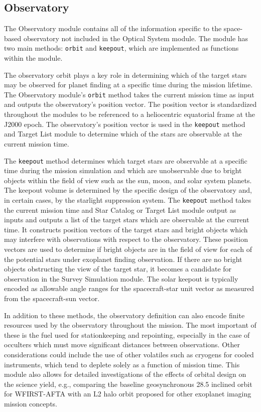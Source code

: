 \documentclass[cleanfoot]{asme2ej}
\begin{document}

\subsection{Observatory}
The Observatory module contains all of the information specific to the space-based observatory not included in the Optical System module. The module has two main methods: \verb+orbit+ and \verb+keepout+, which are implemented as functions within the module. 

The observatory orbit plays a key role in determining which of the target stars may be observed for planet finding at a specific time during the mission lifetime. The Observatory module's \verb+orbit+ method takes the current mission time as input and outputs the observatory's position vector. The position vector is standardized throughout the modules to be referenced to a heliocentric equatorial frame at the J2000 epoch. The observatory's position vector is used in the \verb+keepout+ method and Target List module to determine which of the stars are observable at the current mission time.

The \verb+keepout+ method determines which target stars are observable at a specific time during the mission simulation and which are unobservable due to bright objects within the field of view such as the sun, moon, and solar system planets.  The keepout volume is determined by the specific design of the observatory and, in certain cases, by the starlight suppression system.  The \verb+keepout+ method takes the current mission time and Star Catalog or Target List module output as inputs and outputs a list of the target stars which are observable at the current time. It constructs position vectors of the target stars and bright objects which may interfere with observations with respect to the observatory. These position vectors are used to determine if bright objects are in the field of view for each of the potential stars under exoplanet finding observation.  If there are no bright objects obstructing the view of the target star, it becomes a candidate for observation in the Survey Simulation module.  The solar keepout is typically encoded as allowable angle ranges for the spacecraft-star unit vector as measured from the spacecraft-sun vector.

In addition to these methods, the observatory definition can also encode finite resources used by the observatory throughout the mission.  The most important of these is the fuel used for stationkeeping and repointing, especially in the case of occulters which must move significant distances between observations.  Other considerations could include the use of other volatiles such as cryogens for cooled instruments, which tend to deplete solely as a function of mission time.  This module also allows for detailed investigations of the effects of orbital design on the science yield, e.g., comparing the baseline geosynchronous 28.5\textdegree{} inclined orbit for WFIRST-AFTA with an L2 halo orbit proposed for other exoplanet imaging mission concepts. 
\end{document}
